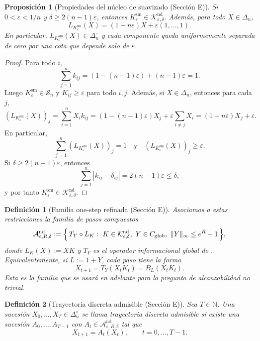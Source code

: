 ﻿\documentclass[12pt]{article}
\newcommand{\fuente}[1]{\textnormal{(#1)}}
\newtheorem{definicion}{Definición}[section]
\newtheorem{proposicion}{Proposición}[section]
\begin{document}
\begin{proposicion}[Propiedades del núcleo de suavizado \fuente{Sección E}]
Si \(0<\varepsilon<1/n\) y \(\delta\ge 2(n-1)\varepsilon\), entonces \(K_\varepsilon^{\mathrm{sm}}\in\mathcal K_{\varepsilon,\delta}^{\mathrm{nd}}\). Además, para todo \(X\in\Delta_n\),
\[
L_{K_\varepsilon^{\mathrm{sm}}}(X)
=(1-n\varepsilon)X+\varepsilon(1,\dots,1).
\]
En particular, \(L_{K_\varepsilon^{\mathrm{sm}}}(X)\in\Delta_n^\circ\) y cada componente queda uniformemente separada de cero por una cota que depende solo de \(\varepsilon\).
\end{proposicion}
\begin{proof}
Para todo \(i\),
\[
\sum_{j=1}^n k_{ij}
=(1-(n-1)\varepsilon)+(n-1)\varepsilon
=1.
\]
Luego \(K_\varepsilon^{\mathrm{sm}}\in\mathcal S_n\) y \(K_{ij}\ge\varepsilon\) para todo \(i,j\). Además, si \(X\in\Delta_n\), entonces para cada \(j\),
\[
(L_{K_\varepsilon^{\mathrm{sm}}}(X))_j
=\sum_{i=1}^n X_i k_{ij}
=(1-(n-1)\varepsilon)X_j+\varepsilon\sum_{i\ne j}X_i
=(1-n\varepsilon)X_j+\varepsilon.
\]
En particular,
\[
\sum_{j=1}^n (L_{K_\varepsilon^{\mathrm{sm}}}(X))_j=1
\quad\text{y}\quad
(L_{K_\varepsilon^{\mathrm{sm}}}(X))_j\ge \varepsilon.
\]
Si \(\delta\ge 2(n-1)\varepsilon\), entonces
\[
\sum_{j=1}^n |k_{ij}-\delta_{ij}|
=2(n-1)\varepsilon\le\delta,
\]
y por tanto \(K_\varepsilon^{\mathrm{sm}}\in\mathcal K_{\varepsilon,\delta}^{\mathrm{nd}}\).
\end{proof}

\begin{definicion}[Familia one-step refinada \fuente{Sección E}]
Asociamos a estas restricciones la familia de pasos compuestos
\[
\mathcal A_{\varepsilon,R,\delta}^{\mathrm{nd}}
:=
\Bigl\{\,T_Y\circ L_K:\ K\in\mathcal K_{\varepsilon,\delta}^{\mathrm{nd}},\ Y\in C_{\mathrm{glob}},\ \|Y\|_\infty\le e^R-1\,\Bigr\},
\]
donde \(L_K(X):=XK\) y \(T_Y\) es el operador informacional global de \cite{ControlInformacional2026}. Equivalentemente, si \(L:=1+Y\), cada paso tiene la forma
\[
X_{t+1}=T_Y(X_tK_t)=B_L(X_tK_t).
\]
Esta es la familia que se usará en adelante para la pregunta de alcanzabilidad no trivial.
\end{definicion}


\begin{definicion}[Trayectoria discreta admisible \fuente{Sección E}]
Sea \(T\in\mathbb N\). Una sucesión \(X_0,\dots,X_T\in\Delta_n^\circ\) se llama \emph{trayectoria discreta admisible} si existe una sucesión \(A_0,\dots,A_{T-1}\) con \(A_t\in\mathcal A_{\varepsilon,R,\delta}^{\mathrm{nd}}\) tal que
\[
X_{t+1}=A_t(X_t),\qquad t=0,\dots,T-1.
\]
\end{definicion}
\end{document}
